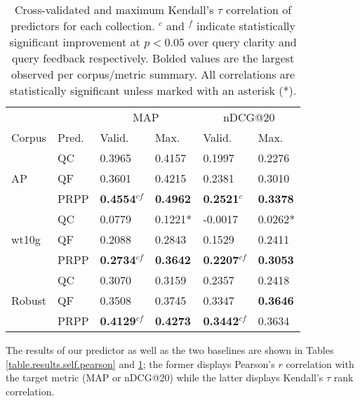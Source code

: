 \documentclass{sig-alternate}
\begin{document}
\begin{table}
\begin{tabular}{|l|l|l|l|l|l|} \hline
& & \multicolumn{2}{c|}{MAP} & \multicolumn{2}{c|}{nDCG@20} \\ \cline{3-6}
Corpus & Pred. & Valid. & Max. & Valid. & Max. \\ \hline\hline
\multirow{3}{*}{AP} & QC & 0.3965 & 0.4157 & 0.1997 & 0.2276 \\ \cline{2-6}
& QF & 0.3601 & 0.4215 & 0.2381 & 0.3010 \\ \cline{2-6}
& PRPP & \textbf{0.4554}$^{cf}$ & \textbf{0.4962} & \textbf{0.2521}$^{c}$ & \textbf{0.3378} \\ \hline\hline
\multirow{3}{*}{wt10g} & QC & 0.0779 & 0.1221* & -0.0017 & 0.0262*\\ \cline{2-6}
& QF & 0.2088 & 0.2843 & 0.1529 & 0.2411 \\ \cline{2-6}
& PRPP & \textbf{0.2734}$^{cf}$ & \textbf{0.3642} & \textbf{0.2207}$^{cf}$ & \textbf{0.3053} \\ \hline\hline
\multirow{3}{*}{Robust} & QC & 0.3070 & 0.3159 & 0.2357 & 0.2418 \\ \cline{2-6}
& QF & 0.3508 & 0.3745 & 0.3347 & \textbf{0.3646} \\ \cline{2-6}
& PRPP & \textbf{0.4129}$^{cf}$ & \textbf{0.4273} & \textbf{0.3442}$^{cf}$ & 0.3634 \\ \hline
\end{tabular}
\caption{Cross-validated and maximum Kendall's $\tau$ correlation of predictors for each collection. $^c$ and $^f$ indicate statistically significant improvement at $p < 0.05$ over query clarity and query feedback respectively. Bolded values are the largest observed per corpus/metric summary. All correlations are statistically significant unless marked with an asterisk (*).}
\label{table.results.self.kendall}
\end{table}

The results of our predictor as well as the two baselines are shown in Tables \ref{table.results.self.pearson} and \ref{table.results.self.kendall}; the former displays Pearson's $r$ correlation with the target metric (MAP or nDCG@20) while the latter displays Kendall's $\tau$ rank correlation.
\end{document}
